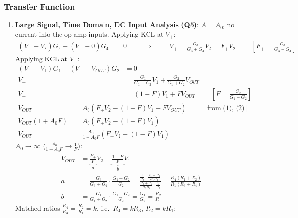 \subsubsection{Transfer Function}
\begin{enumerate}
  \item \textbf{Large Signal, Time Domain, DC Input Analysis (Q5)}: \(A = A_0\), no
    current into the op-amp inputs. Applying KCL at \(V_+\):
    \begin{align*}
      (V_+ - V_2) G_3 + (V_+ - 0) G_4 &= 0 \hspace{1cm} \Rightarrow \hspace{1cm}
      V_+ = \frac{G_3}{G_3 + G_4} V_2 = F_+ V_2 \hspace{1cm} \left[F_+ = \tfrac{G_3}{G_3 + G_4}\right] \tag{1}
    \end{align*}
    Applying KCL at \(V_-\):
    \begin{align*}
      (V_- - V_1) G_1 + (V_- - V_{OUT}) G_2 &= 0 \\
      V_- &= \frac{G_1}{G_1 + G_2} V_1 + \frac{G_2}{G_1 + G_2} V_{OUT} \\
      V_- &= (1 - F) V_1 + F V_{OUT} \hspace{1cm} \left[F = \tfrac{G_2}{G_1 + G_2}\right] \tag{2}
    \end{align*}
    \begin{align*}
      V_{OUT} &= A_0\left(F_+ V_2 - (1 - F) V_1 - F V_{OUT}\right) \hspace{1cm} [\text{from (1), (2)}] \\
      V_{OUT}(1 + A_0 F) &= A_0\left(F_+ V_2 - (1 - F) V_1\right) \\
      V_{OUT} &= \frac{A_0}{1 + A_0 F}\left(F_+ V_2 - (1 - F) V_1\right) \tag{3}
    \end{align*}
    \(A_0 \to \infty\) (\(\frac{A_0}{1 + A_0 F} \to \frac{1}{F}\)):
    \begin{align*}
      V_{OUT} &= \underbrace{\frac{F_+}{F}}_{a} V_2 - \underbrace{\frac{1 - F}{F}}_{b} V_1 \\
      a &= \frac{G_3}{G_3 + G_4}\cdot\frac{G_1 + G_2}{G_2} = \frac{\frac{1}{R_3}\cdot\frac{R_1 + R_2}{R_1 R_2}}{\frac{R_3 + R_4}{R_3 R_4}\cdot\frac{1}{R_2}} = \frac{R_4 (R_1 + R_2)}{R_1 (R_3 + R_4)} \\
      b &= \frac{G_1}{G_1 + G_2}\cdot\frac{G_1 + G_2}{G_2} = \frac{G_1}{G_2} = \frac{R_2}{R_1}
    \end{align*}
    Matched ratios \(\frac{R_4}{R_3} = \frac{R_2}{R_1} = k\), i.e.\ \(R_4 = k R_3\), \(R_2 = k R_1\):

\end{enumerate}
